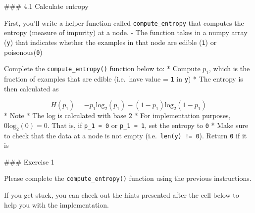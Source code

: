 \documentclass[11pt]{article}
\begin{document}
    \#\#\# 4.1 Calculate entropy

First, you'll write a helper function called \texttt{compute\_entropy}
that computes the entropy (measure of impurity) at a node. - The
function takes in a numpy array (\texttt{y}) that indicates whether the
examples in that node are edible (\texttt{1}) or poisonous(\texttt{0})

Complete the \texttt{compute\_entropy()} function below to: * Compute
\(p_1\), which is the fraction of examples that are edible (i.e.~have
value = \texttt{1} in \texttt{y}) * The entropy is then calculated as

\[H(p_1) = -p_1 \text{log}_2(p_1) - (1- p_1) \text{log}_2(1- p_1)\] *
Note * The log is calculated with base \(2\) * For implementation
purposes, \(0\text{log}_2(0) = 0\). That is, if \texttt{p\_1\ =\ 0} or
\texttt{p\_1\ =\ 1}, set the entropy to \texttt{0} * Make sure to check
that the data at a node is not empty (i.e.~\texttt{len(y)\ !=\ 0}).
Return \texttt{0} if it is

\#\#\# Exercise 1

Please complete the \texttt{compute\_entropy()} function using the
previous instructions.

If you get stuck, you can check out the hints presented after the cell
below to help you with the implementation.
\end{document}
